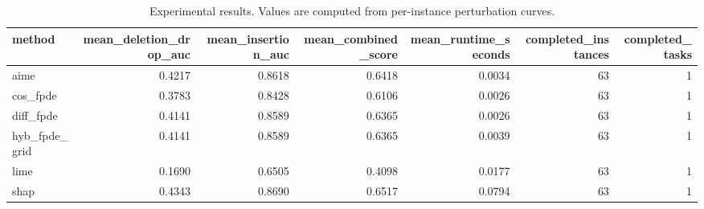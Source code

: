 \begin{table}[t]
\caption{Experimental results. Values are computed from per-instance perturbation curves.}
\label{tab:main_results_computed}
\centering
\begin{tabular}{lrrrrrr}
\toprule
method & mean\_deletion\_drop\_auc & mean\_insertion\_auc & mean\_combined\_score & mean\_runtime\_seconds & completed\_instances & completed\_tasks \\
\midrule
aime & 0.4217 & 0.8618 & 0.6418 & 0.0034 & 63 & 1 \\
cos\_fpde & 0.3783 & 0.8428 & 0.6106 & 0.0026 & 63 & 1 \\
diff\_fpde & 0.4141 & 0.8589 & 0.6365 & 0.0026 & 63 & 1 \\
hyb\_fpde\_grid & 0.4141 & 0.8589 & 0.6365 & 0.0039 & 63 & 1 \\
lime & 0.1690 & 0.6505 & 0.4098 & 0.0177 & 63 & 1 \\
shap & 0.4343 & 0.8690 & 0.6517 & 0.0794 & 63 & 1 \\
\bottomrule
\end{tabular}

\end{table}
